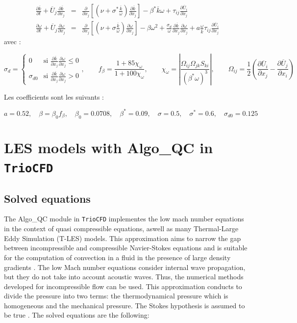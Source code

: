 \begin{eqnarray*}
\frac{\partial\overline{k}}{\partial t}+\overline{U}_{j}\frac{\partial\overline{k}}{\partial x_{j}} & = & \frac{\partial}{\partial x_{j}}\left[\left(\nu+\sigma^{*}\frac{\overline{k}}{\omega}\right)\frac{\partial\overline{k}}{\partial x_{j}}\right]-\beta^{*}\overline{k}\omega+\tau_{ij}\frac{\partial\overline{U}_{i}}{\partial x_{j}}\\
\frac{\partial\omega}{\partial t}+\overline{U}_{j}\frac{\partial\omega}{\partial x_{j}} & = & \frac{\partial}{\partial x_{j}}\left[\left(\nu+\sigma\frac{\overline{k}}{\omega}\right)\frac{\partial\omega}{\partial x_{j}}\right]-\beta\omega^{2}+\frac{\sigma_{d}}{\omega}\frac{\partial\overline{k}}{\partial x_{j}}\frac{\partial\omega}{\partial x_{j}}+a\frac{\omega}{\overline{k}}\tau_{ij}\frac{\partial\overline{U}_{i}}{\partial x_{j}}
\end{eqnarray*}
avec :

\[
\sigma_{d}=\begin{cases}
0 & \mbox{si }\frac{\partial\overline{k}}{\partial x_{j}}\frac{\partial\omega}{\partial x_{j}}\leq0\\
\sigma_{d0} & \mbox{si }\frac{\partial\overline{k}}{\partial x_{j}}\frac{\partial\omega}{\partial x_{j}}>0
\end{cases},\qquad f_{\beta}=\frac{1+85\chi_{\omega}}{1+100\chi_{\omega}},\qquad\chi_{\omega}=\left|\frac{\Omega_{ij}\Omega_{jk}S_{ki}}{(\beta^{*}\omega)^{3}}\right|,\qquad\Omega_{ij}=\frac{1}{2}\left(\frac{\partial\overline{U}_{i}}{\partial x_{j}}-\frac{\partial\overline{U}_{j}}{\partial x_{i}}\right)
\]


Les coefficients sont les suivants :

\[
a=0.52,\quad\beta=\beta_{0}f_{\beta},\quad\beta_{0}=0.0708,\quad\beta^{*}=0.09,\quad\sigma=0.5,\quad\sigma^{*}=0.6,\quad\sigma_{d0}=0.125
\]


\chapter{LES models with Algo\_QC in \texttt{TrioCFD}}
\section{Solved equations}
The Algo\_QC module in \texttt{TrioCFD} implementes the low mach number equations in the context of quasi compressible equations, aswell as many Thermal-Large Eddy Simulation (T-LES) models.  This approximation aims to narrow the gap between incompressible and compressible Navier-Stokes equations and is suitable for the computation of convection in a fluid in the presence of large density gradients \cite{paolucci_filtering_1982}. The low Mach number equations consider internal wave propagation, but they do not take into account acoustic waves. Thus, the numerical methods developed for incompressible flow can be used. This approximation conducts to divide the pressure into two terms: the thermodynamical pressure which is homogeneous and the mechanical pressure. The Stokes hypothesis is assumed to be true \cite{Papalexandris2019}. The solved equations are the following:



